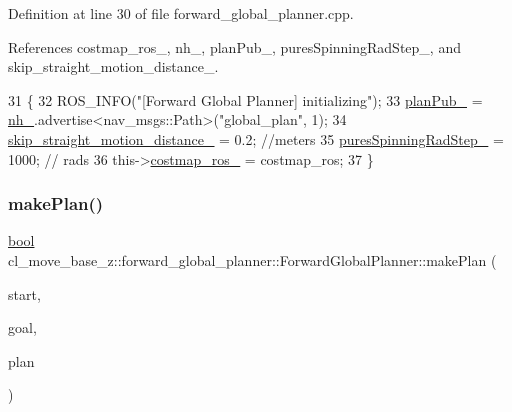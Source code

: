 Definition at line 30 of file forward\+\_\+global\+\_\+planner.\+cpp.



References costmap\+\_\+ros\+\_\+, nh\+\_\+, plan\+Pub\+\_\+, pures\+Spinning\+Rad\+Step\+\_\+, and skip\+\_\+straight\+\_\+motion\+\_\+distance\+\_\+.


\begin{DoxyCode}
31 \{
32     ROS\_INFO(\textcolor{stringliteral}{"[Forward Global Planner] initializing"});
33     \hyperlink{classcl__move__base__z_1_1forward__global__planner_1_1ForwardGlobalPlanner_a927dc6a687fac3751033d9736cf8dfcf}{planPub\_} = \hyperlink{classcl__move__base__z_1_1forward__global__planner_1_1ForwardGlobalPlanner_aab61c90829040df58fb99dff3b566c72}{nh\_}.advertise<nav\_msgs::Path>(\textcolor{stringliteral}{"global\_plan"}, 1);
34     \hyperlink{classcl__move__base__z_1_1forward__global__planner_1_1ForwardGlobalPlanner_abafd101fa62caf2d74f118a0b4bb948c}{skip\_straight\_motion\_distance\_} = 0.2; \textcolor{comment}{//meters}
35     \hyperlink{classcl__move__base__z_1_1forward__global__planner_1_1ForwardGlobalPlanner_a6aed6f8f6e57a8c5821977814d0b9402}{puresSpinningRadStep\_} = 1000;         \textcolor{comment}{// rads}
36     this->\hyperlink{classcl__move__base__z_1_1forward__global__planner_1_1ForwardGlobalPlanner_a711d4a0d92a216eb8cab3b42f18eb795}{costmap\_ros\_} = costmap\_ros;
37 \}
\end{DoxyCode}
\mbox{\label{classcl__move__base__z_1_1forward__global__planner_1_1ForwardGlobalPlanner_a9d7c48877a390ca3cc580a7ffa50d316}} 
\subsubsection{\texorpdfstring{make\+Plan()}{makePlan()}\hspace{0.1cm}{\footnotesize\ttfamily [1/2]}}
{\footnotesize\ttfamily \hyperlink{classbool}{bool} cl\+\_\+move\+\_\+base\+\_\+z\+::forward\+\_\+global\+\_\+planner\+::\+Forward\+Global\+Planner\+::make\+Plan (\begin{DoxyParamCaption}\item[{const geometry\+\_\+msgs\+::\+Pose\+Stamped \&}]{start,  }\item[{const geometry\+\_\+msgs\+::\+Pose\+Stamped \&}]{goal,  }\item[{std\+::vector$<$ geometry\+\_\+msgs\+::\+Pose\+Stamped $>$ \&}]{plan }\end{DoxyParamCaption})}



